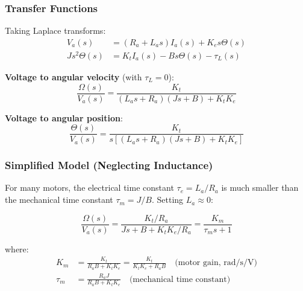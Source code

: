 \subsubsection{Transfer Functions}

Taking Laplace transforms:
\begin{align}
V_a(s) &= (R_a + L_a s)I_a(s) + K_e s\Theta(s) \\
Js^2\Theta(s) &= K_t I_a(s) - Bs\Theta(s) - \tau_L(s)
\end{align}

\textbf{Voltage to angular velocity} (with $\tau_L = 0$):
\begin{equation}
\frac{\Omega(s)}{V_a(s)} = \frac{K_t}{(L_a s + R_a)(Js + B) + K_t K_e}
\end{equation}

\textbf{Voltage to angular position}:
\begin{equation}
\frac{\Theta(s)}{V_a(s)} = \frac{K_t}{s[(L_a s + R_a)(Js + B) + K_t K_e]}
\end{equation}

\subsubsection{Simplified Model (Neglecting Inductance)}

For many motors, the electrical time constant $\tau_e = L_a/R_a$ is much smaller than the mechanical time constant $\tau_m = J/B$. Setting $L_a \approx 0$:

\begin{equation}
\frac{\Omega(s)}{V_a(s)} = \frac{K_t/R_a}{Js + B + K_t K_e/R_a} = \frac{K_m}{\tau_m s + 1}
\end{equation}

where:
\begin{align}
K_m &= \frac{K_t}{R_a B + K_t K_e} = \frac{K_t}{K_t K_e + R_a B} \quad \text{(motor gain, rad/s/V)} \\
\tau_m &= \frac{R_a J}{R_a B + K_t K_e} \quad \text{(mechanical time constant)}
\end{align}

